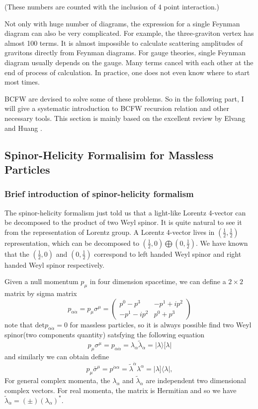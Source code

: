 \documentclass[12pt]{article}
\numberwithin{equation}{section}
\newcommand{\aket}[1]{|#1\rangle}
\newcommand{\sket}[1]{|#1]}
\begin{document}
\noindent
{
(These numbers are counted with the inclusion of 4 point interaction.)}

Not only with huge number
of diagrams, the expression for a single Feynman diagram can also be very complicated. For example, the
three-graviton vertex has almost 100 terms. It is almost impossible to calculate scattering amplitudes of
gravitons directly from Feynman diagrams. For gauge theories, single Feynman diagram usually depends
on the gauge. Many terms cancel with each other at the end of process of calculation. In practice, one does not
even know where to start most times.

BCFW are devised to solve some of these problems. So in the following part, I will give a systematic introduction to BCFW
recursion relation and other necessary tools. This section is mainly based on the excellent review by Elvang and Huang \cite{Elvang:2013cua}.
\subsection{Spinor-Helicity Formalisim for Massless Particles}
\subsubsection{Brief introduction of spinor-helicity formalism}
The spinor-helicity formalism just told us that a light-like Lorentz 4-vector can be decomposed to the product of 
two Weyl spinor. It is quite natural to see it from the representation of Lorentz group. A Lorentz 4-vector lives in $(\frac{1}{2},\frac{1}{2})$ representation,
which can be decomposed to $(\frac{1}{2},0)\bigoplus (0,\frac{1}{2})$. We have known that the $(\frac{1}{2},0)$ and $(0,\frac{1}{2})$ correspond to left handed Weyl spinor and 
right handed Weyl spinor respectively.

Given a null momentum $p_\mu$ in four dimension spacetime, we can define a $2\times2$ matrix by sigma matrix 
\begin{equation*}
    p_{\alpha\dot{\alpha}}=p_\mu\sigma^\mu=\begin{pmatrix}
        p^0-p^3 & -p^1+ip^2\\
        -p^1-ip^2 & p^0+p^3
    \end{pmatrix}
\end{equation*}
note that det$p_{\alpha\dot{\alpha}}=0$ for massless particles, so it is always possible find two Weyl spinor(two components quantity) satsfying the following equation
\begin{equation}
    p_\mu \sigma^\mu=p_{\alpha\dot{\alpha}}=\lambda_\alpha \tilde{\lambda}_{\dot{\alpha}}=\aket{\lambda}[\lambda|
    \label{2.1}
\end{equation}
and similarly we can obtain define
\begin{equation}
    p_\mu \bar{\sigma}^\mu=p^{\dot{\alpha}\alpha}=\tilde{\lambda}^{\dot{\alpha}}\lambda^\alpha=\sket{\lambda} \langle \lambda |,
\end{equation}
For general complex momenta, the $\lambda_\alpha$ and $\tilde{\lambda}_{\dot{\alpha}}$ are independent two dimensional complex vectors. For real momenta, the matrix is Hermitian and 
so we have $\tilde{\lambda}_{\dot{\alpha}}=(\pm)(\lambda_\alpha)^*$.
\end{document}
